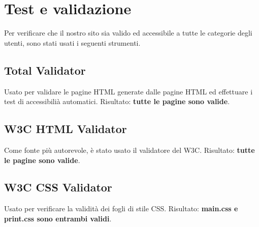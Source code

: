 \documentclass[1_relazione.tex]{subfiles}
\begin{document}
    \section{Test e validazione}\label{sec:test-e-validazione}
    Per verificare che il nostro sito sia valido ed accessibile a tutte le categorie degli utenti, sono stati usati i seguenti strumenti.

    \subsection{Total Validator}
    Usato per validare le pagine HTML generate dalle pagine HTML ed effettuare i test di accessibili\`{a} automatici.\newline
    Risultato: \textbf{tutte le pagine sono valide}.
    \subsection{W3C HTML Validator}
    Come fonte pi\`{u} autorevole, \`{e} stato usato il validatore del W3C.\newline
    Risultato: \textbf{tutte le pagine sono valide}.
    \subsection{W3C CSS Validator}
    Usato per verificare la validit\`{a} dei fogli di stile CSS. \newline
    Risultato: \textbf{main.css e print.css sono entrambi validi}.
\end{document}
